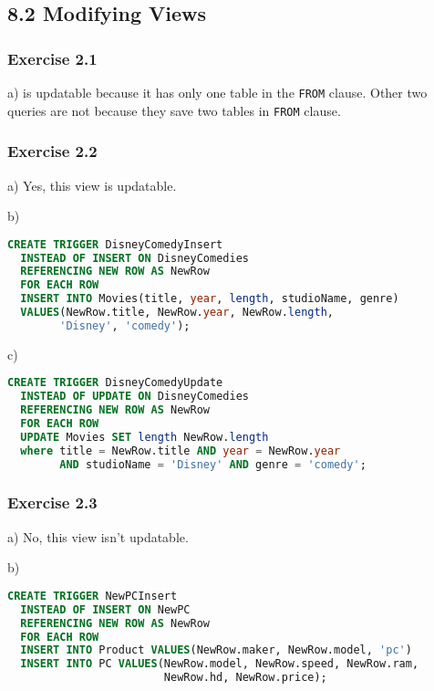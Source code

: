 \documentclass[../../main.tex]{subfiles}
\begin{document}
\subsection*{8.2 Modifying Views}

\subsubsection*{Exercise 2.1}

a) is updatable because it has only one table in the \verb|FROM|
clause. Other two queries are not because they save two
tables in \verb|FROM| clause.

\subsubsection*{Exercise 2.2}

a) Yes, this view is updatable.

b)

\begin{lstlisting}[language=sql]
  CREATE TRIGGER DisneyComedyInsert
  INSTEAD OF INSERT ON DisneyComedies
  REFERENCING NEW ROW AS NewRow
  FOR EACH ROW
  INSERT INTO Movies(title, year, length, studioName, genre)
  VALUES(NewRow.title, NewRow.year, NewRow.length,
        'Disney', 'comedy');
\end{lstlisting}

c)

\begin{lstlisting}[language=sql]
  CREATE TRIGGER DisneyComedyUpdate
  INSTEAD OF UPDATE ON DisneyComedies
  REFERENCING NEW ROW AS NewRow
  FOR EACH ROW
  UPDATE Movies SET length NewRow.length
  where title = NewRow.title AND year = NewRow.year
        AND studioName = 'Disney' AND genre = 'comedy';
\end{lstlisting}

\subsubsection*{Exercise 2.3}

a) No, this view isn't updatable.

b)

\begin{lstlisting}[language=sql]
  CREATE TRIGGER NewPCInsert
  INSTEAD OF INSERT ON NewPC
  REFERENCING NEW ROW AS NewRow
  FOR EACH ROW
  INSERT INTO Product VALUES(NewRow.maker, NewRow.model, 'pc')
  INSERT INTO PC VALUES(NewRow.model, NewRow.speed, NewRow.ram,
                        NewRow.hd, NewRow.price);
\end{lstlisting}
\end{document}
